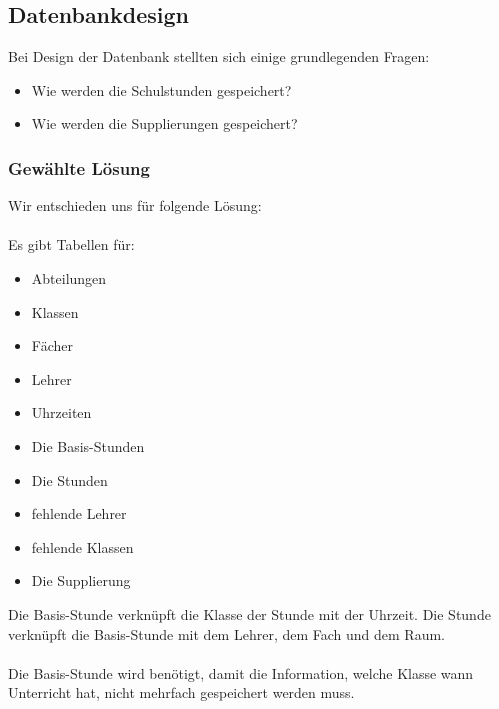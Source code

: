 \subsection{Datenbankdesign}
\label{sec:content_solution_db}
Bei Design der Datenbank stellten sich einige grundlegenden Fragen:

\begin{itemize}
	\item Wie werden die Schulstunden gespeichert?
	\item Wie werden die Supplierungen gespeichert?
\end{itemize}

\subsubsection{Gewählte Lösung}
Wir entschieden uns für folgende Lösung:\\
\\
Es gibt Tabellen für:\\
\begin{itemize}
	\item Abteilungen
	\item Klassen
	\item Fächer
	\item Lehrer
	\item Uhrzeiten
\end{itemize}
\vspace{0.03cm}
\begin{itemize}
	\item Die Basis-Stunden
	\item Die Stunden
\end{itemize}
\vspace{0.03cm}
\begin{itemize}
	\item fehlende Lehrer
	\item fehlende Klassen
\end{itemize}
\vspace{0.03cm}
\begin{itemize}
	\item Die Supplierung
\end{itemize}
Die Basis-Stunde verknüpft die Klasse der Stunde mit der Uhrzeit. Die Stunde verknüpft die Basis-Stunde mit dem Lehrer, dem Fach und dem Raum.\\
\\
Die Basis-Stunde wird benötigt, damit die Information, welche Klasse wann Unterricht hat, nicht mehrfach gespeichert werden muss.\\
